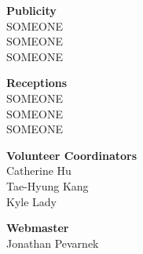 \documentclass[twoside]{article}
\begin{document}
\begin{multicols}{2}
\begin{minipage}{\columnwidth}
\end{minipage}
	\begin{minipage}{\columnwidth}
	{\bf Publicity}\\
	SOMEONE\\
	SOMEONE\\
	SOMEONE\\
	
\end{minipage}
	\begin{minipage}{\columnwidth}
	{\bf Receptions}\\
	SOMEONE\\
	SOMEONE\\
	SOMEONE\\
	
\end{minipage}
	\begin{minipage}{\columnwidth}
	{\bf Volunteer Coordinators}\\
	Catherine Hu\\
	Tae-Hyung Kang\\
	Kyle Lady\\
	
\end{minipage}
	\begin{minipage}{\columnwidth}
	{\bf Webmaster}\\
	Jonathan Pevarnek\\
	

\end{minipage}
\end{multicols}
\end{document}
